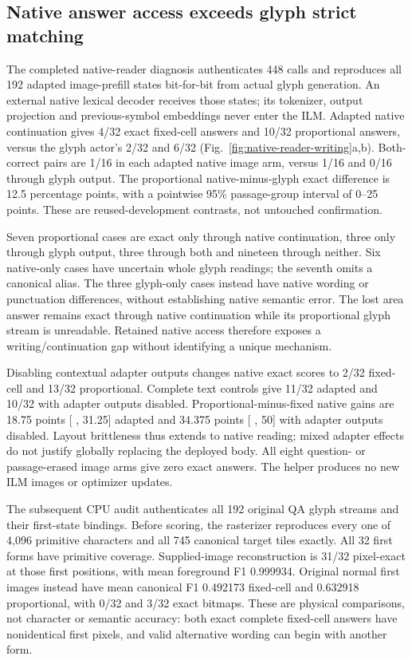 \documentclass[12pt,a4paper]{article}
\providecommand{\DIFadd}[1]{{\protect\color{blue} \sf #1}} %
\begin{document}
\subsection*{\DIFadd{Native answer access exceeds glyph strict matching}}
\DIFadd{The completed native-reader diagnosis authenticates 448 calls and reproduces
all 192 adapted image-prefill states bit-for-bit from actual glyph generation.
An external native lexical decoder receives those states; its tokenizer,
output projection and previous-symbol embeddings never enter the ILM.
Adapted native continuation gives 4/32 exact fixed-cell answers and 10/32
proportional answers, versus the glyph actor's 2/32 and 6/32
(Fig.~\ref{fig:native-reader-writing}a,b). Both-correct pairs are 1/16 in
each adapted native image arm, versus 1/16 and 0/16 through glyph output.
The proportional native-minus-glyph exact difference is 12.5 percentage
points, with a pointwise 95\% passage-group interval of 0--25 points.
These are reused-development contrasts, not untouched confirmation.
}

\DIFadd{Seven proportional cases are exact only through native continuation, three
only through glyph output, three through both and nineteen through neither.
Six native-only cases have uncertain whole glyph readings; the seventh omits
a canonical alias. The three glyph-only cases instead have native wording or
punctuation differences, without establishing native semantic error. The lost
area answer remains exact through native continuation while its proportional
glyph stream is unreadable. Retained native access therefore exposes a
writing/continuation gap without identifying a unique mechanism.
}

\DIFadd{Disabling contextual adapter outputs changes native exact scores to 2/32
fixed-cell and 13/32 proportional. Complete text controls give 11/32 adapted
and 10/32 with adapter outputs disabled. Proportional-minus-fixed native gains
are 18.75 points }[\DIFadd{6.25, 31.25}] \DIFadd{adapted and 34.375 points }[\DIFadd{21.875, 50}] \DIFadd{with
adapter outputs disabled. Layout brittleness thus extends to native reading;
mixed adapter effects do not justify globally replacing the deployed body.
All eight question- or passage-erased image arms give zero exact answers.
The helper produces no new ILM images or optimizer updates.
}

\DIFadd{The subsequent CPU audit authenticates all 192 original QA glyph streams and
their first-state bindings. Before scoring, the rasterizer reproduces every
one of 4,096 primitive characters and all 745 canonical target tiles exactly.
All 32 first forms have primitive coverage. Supplied-image reconstruction is
31/32 pixel-exact at those first positions, with mean foreground F1 0.999934.
Original normal first images instead have mean canonical F1 0.492173 fixed-cell
and 0.632918 proportional, with 0/32 and 3/32 exact bitmaps. These are physical
comparisons, not character or semantic accuracy: both exact complete fixed-cell
answers have nonidentical first pixels, and valid alternative wording can
begin with another form.
}
\end{document}
